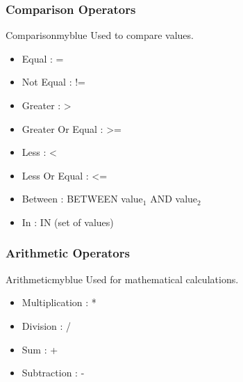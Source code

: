 \subsubsection{Comparison Operators}
\begin{prettyBox}{Comparison}{myblue}
Used to compare values.
    \begin{itemize}
             \item Equal : = 
             \item Not Equal : != 
             \item Greater : \textgreater
             \item Greater Or Equal : \textgreater= 
             \item Less : \textless
             \item Less Or Equal : \textless= 
             \item Between : BETWEEN value$_{1}$ AND value$_{2}$
             \item In : IN (set of values)
             \end{itemize} 
\end{prettyBox}

\subsubsection{Arithmetic Operators}
\begin{prettyBox}{Arithmetic}{myblue}
Used for mathematical calculations.
    \begin{itemize} 
           \item Multiplication : *
           \item Division : / 
           \item Sum : + 
           \item Subtraction : -
           \end{itemize}
\end{prettyBox}


